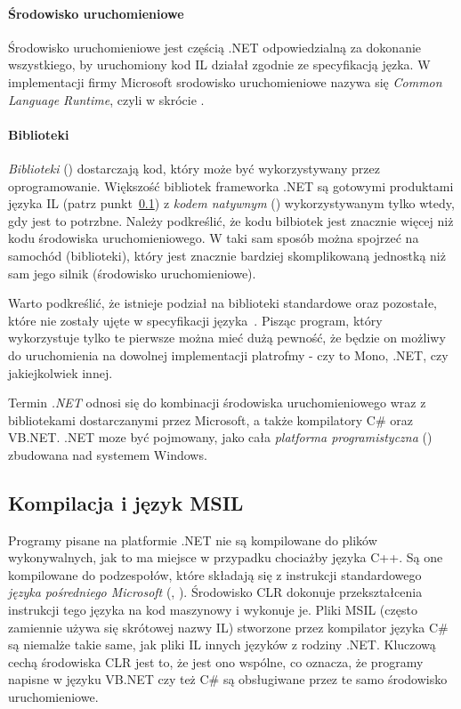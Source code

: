 \paragraph{Środowisko uruchomieniowe}
Środowisko uruchomieniowe jest częścią .NET odpowiedzialną za dokonanie wszystkiego, by uruchomiony kod IL działał zgodnie ze specyfikacją jęzka. W implementacji firmy Microsoft srodowisko uruchomieniowe nazywa się \emph{Common Language Runtime}, czyli w skrócie .

\paragraph{Biblioteki}
\emph{Biblioteki} () dostarczają kod, który może być wykorzystywany przez oprogramowanie. Większość bibliotek frameworka .NET są gotowymi produktami języka IL (patrz punkt~\ref{sec:msil}) z \emph{kodem natywnym} () wykorzystywanym tylko wtedy, gdy jest to potrzbne. Należy podkreślić, że kodu bilbiotek jest znacznie więcej niż kodu środowiska uruchomieniowego. W taki sam sposób można spojrzeć na samochód (biblioteki), który jest znacznie bardziej skomplikowaną jednostką niż sam jego silnik (środowisko uruchomieniowe).

Warto podkreślić, że istnieje podział na biblioteki standardowe oraz pozostałe, które nie zostały ujęte w specyfikacji języka~\cite{cSharp:spec}. Pisząc program, który wykorzystuje tylko te pierwsze można mieć dużą pewność, że będzie on możliwy do uruchomienia na dowolnej implementacji platrofmy - czy to Mono, .NET, czy jakiejkolwiek innej.

Termin \emph{.NET} odnosi się do kombinacji środowiska uruchomieniowego wraz z bibliotekami dostarczanymi przez Microsoft, a także kompilatory C\# oraz VB.NET. .NET moze być pojmowany, jako cała \emph{platforma programistyczna} () zbudowana nad systemem Windows.


\subsection{Kompilacja i język MSIL}\label{sec:msil}
Programy pisane na platformie .NET nie są kompilowane do plików wykonywalnych, jak to ma miejsce w przypadku chociażby języka C++. Są one kompilowane do podzespołów, które składają się z instrukcji standardowego \emph{języka pośredniego Microsoft} (, ). Środowisko CLR dokonuje przekształcenia instrukcji tego języka na kod maszynowy i wykonuje je. Pliki MSIL (często zamiennie używa się skrótowej nazwy IL) stworzone przez kompilator języka C\# są niemalże takie same, jak pliki IL innych języków z rodziny .NET. Kluczową cechą środowiska CLR jest to, że jest ono wspólne, co oznacza, że programy napisne w języku VB.NET czy też C\# są obsługiwane przez te samo środowisko uruchomieniowe.

